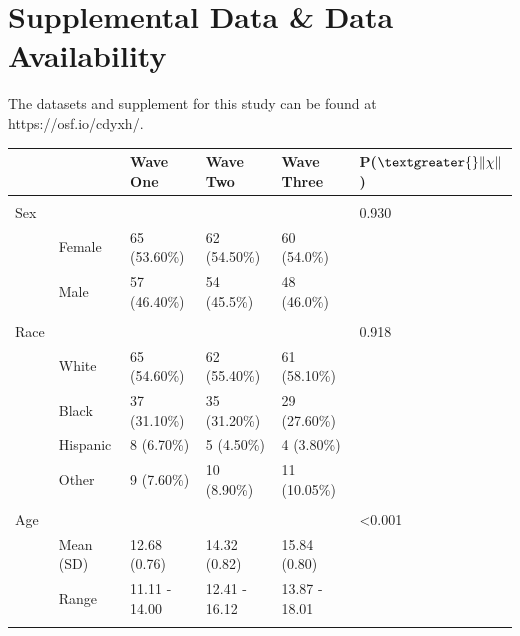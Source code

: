 \documentclass{article}%
\begin{document}
\section*{Supplemental Data \& Data Availability}
The datasets and supplement for this study can be found at https://osf.io/cdyxh/.
%
\clearpage


%
\clearpage
\begin{table}[h!]
\begin{tabular}{llllll}
                    &                 & Wave One         & Wave Two         & Wave Three       & P($\textgreater{}\|\chi\|$)       \\ \hline \\
Sex                 &                 &                  &                  &                  & 0.930                    \\
                    & Female          & 65 (53.60\%)     & 62 (54.50\%)     & 60 (54.0\%)      &                          \\
                    & Male            & 57 (46.40\%)     & 54 (45.5\%)      & 48 (46.0\%)      &                          \\ \hline \\
Race                &                 &                  &                  &                  & 0.918                    \\
                    & White           & 65 (54.60\%)      & 62 (55.40\%)      & 61 (58.10\%)      &                          \\
                    & Black           & 37 (31.10\%)      & 35 (31.20\%)      & 29 (27.60\%)      &                          \\
                    & Hispanic        & 8 (6.70\%)        & 5 (4.50\%)        & 4 (3.80\%)        &                          \\
                    & Other           & 9 (7.60\%)       & 10 (8.90\%)       & 11 (10.05\%)      &                          \\ \hline \\
Age        &                 &                  &                  &                  & \textless 0.001 \\
                    & Mean (SD)       & 12.68 (0.76)   & 14.32 (0.82)   & 15.84 (0.80)   &                          \\
                    & Range           & 11.11 - 14.00    & 12.41 - 16.12     & 13.87 - 18.01    &                          \\       \hline \\              

\end{tabular}
\end{table}
\end{document}
